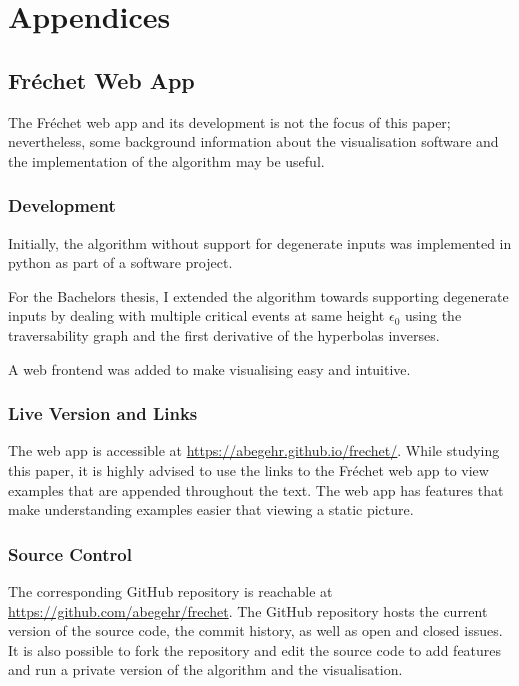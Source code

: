 \appendix

\section{Appendices}

\subsection{Fréchet Web App}

The Fréchet web app and its development is not the focus of this paper; nevertheless, some background information about the visualisation software and the implementation of the algorithm may be useful.

\subsubsection{Development}

Initially, the algorithm without support for degenerate inputs was implemented in python as part of a software project.\

For the Bachelors thesis, I extended the algorithm towards supporting degenerate inputs by dealing with multiple critical events at same height $\epsilon_0$ using the traversability graph and the first derivative of the hyperbolas inverses.\

A web frontend was added to make visualising easy and intuitive.

\subsubsection{Live Version and Links}

The web app is accessible at \url{https://abegehr.github.io/frechet/}. While studying this paper, it is highly advised to use the links to the Fréchet web app to view examples that are appended throughout the text. The web app has features that make understanding examples easier that viewing a static picture.\

\subsubsection{Source Control}

The corresponding GitHub repository is reachable at \url{https://github.com/abegehr/frechet}. The GitHub repository hosts the current version of the source code, the commit history, as well as open and closed issues. It is also possible to fork the repository and edit the source code to add features and run a private version of the algorithm and the visualisation.


